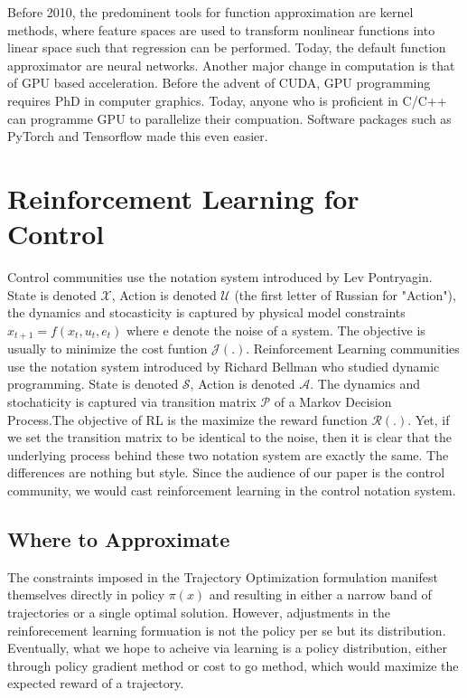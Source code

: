 \documentclass[journal]{IEEEtran}
\begin{document}
Before 2010, the predominent tools for function approximation are kernel methods, where feature spaces are used to transform nonlinear functions into linear space such that regression can be performed. Today, the default function approximator are neural networks. Another major change in computation is that of GPU based acceleration. Before the advent of CUDA, GPU programming requires PhD in computer graphics. Today, anyone who is proficient in C/C++ can programme GPU to parallelize their compuation. Software packages such as PyTorch and Tensorflow made this even easier.

\section{Reinforcement Learning for Control}
Control communities use the notation system introduced by Lev Pontryagin. State is denoted $ \mathcal{X}$, Action is denoted $\mathcal{U}$ (the first letter of Russian for "Action"), the dynamics and stocasticity is captured by physical model constraints $x_{t+1}=f(x_t,u_t,e_t)$ where e denote the noise of a system. The objective is usually to minimize the cost funtion $\mathcal{J(.)}$. Reinforcement Learning communities use the notation system introduced by Richard Bellman who studied dynamic programming. State is denoted $\mathcal{S}$, Action is denoted $\mathcal{A}$. The dynamics and stochaticity is captured via transition matrix $\mathcal{P}$ of a Markov Decision Process.The objective of RL is the maximize the reward function $\mathcal{R(.)}$. Yet, if we set the transition matrix to be identical to the noise, then it is clear that the underlying process behind these two notation system are exactly the same. The differences are nothing but style. Since the audience of our paper is the control community, we would cast reinforcement learning in the control notation system.

\subsection{Where to Approximate}
The constraints imposed in the Trajectory Optimization formulation manifest themselves directly in policy $\pi(x)$ and resulting in either a narrow band of trajectories or a single optimal solution. However, adjustments in the reinforecement learning formuation is not the policy per se but its distribution. Eventually, what we hope to acheive via learning is a policy distribution, either through policy gradient method or cost to go method, which would maximize the expected reward of a trajectory.
\end{document}

